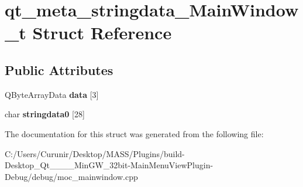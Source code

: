 \hypertarget{structqt__meta__stringdata___main_window__t}{}\section{qt\+\_\+meta\+\_\+stringdata\+\_\+\+Main\+Window\+\_\+t Struct Reference}
\label{structqt__meta__stringdata___main_window__t}
\subsection*{Public Attributes}
\begin{DoxyCompactItemize}
\item 
\mbox{\label{structqt__meta__stringdata___main_window__t_a0a55531510dd06148b7b0f445e2b6c59}} 
Q\+Byte\+Array\+Data {\bfseries data} \mbox{[}3\mbox{]}
\item 
\mbox{\label{structqt__meta__stringdata___main_window__t_a10e266ffded4c5e956d35d922fa94828}} 
char {\bfseries stringdata0} \mbox{[}28\mbox{]}
\end{DoxyCompactItemize}


The documentation for this struct was generated from the following file\+:\begin{DoxyCompactItemize}
\item 
C\+:/\+Users/\+Curunir/\+Desktop/\+M\+A\+S\+S/\+Plugins/build-\/\+Desktop\+\_\+\+Qt\+\_\+\_\+\_\+\_\+\+Min\+G\+W\+\_\+32bit-\/\+Main\+Menu\+View\+Plugin-\/\+Debug/debug/moc\+\_\+mainwindow.\+cpp\end{DoxyCompactItemize}
